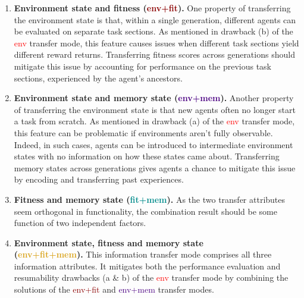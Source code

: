 \documentclass[dvipsnames,format=sigconf,anonymous=false,review=false]{acmart}
\begin{document}
\begin{enumerate}
\item \textbf{Environment state and fitness (\textcolor{DarkRed}{env+fit}).} One property of transferring the environment state is that, within a single generation, different agents can be evaluated on separate task sections. As mentioned in drawback (b) of the \textcolor{red}{env} transfer mode, this feature causes issues when different task sections yield different reward returns. Transferring fitness scores across generations should mitigate this issue by accounting for performance on the previous task sections, experienced by the agent’s ancestors.
 
\item \textbf{Environment state and memory state (\textcolor{Indigo}{env+mem}).} Another property of transferring the environment state is that new agents often no longer start a task from scratch. As mentioned in drawback (a) of the \textcolor{red}{env} transfer mode, this feature can be problematic if environments aren't fully observable. Indeed, in such cases, agents can be introduced to intermediate environment states with no information on how these states came about. Transferring memory states across generations gives agents a chance to mitigate this issue by encoding and transferring past experiences.

\item \textbf{Fitness and memory state (\textcolor{DarkCyan}{fit+mem}).} As the two transfer attributes seem orthogonal in functionality, the combination result should be some function of two independent factors.

\item \textbf{Environment state, fitness and memory state\\(\textcolor{Goldenrod}{env+fit+mem}).} This information transfer mode comprises all three information attributes. It mitigates both the performance evaluation and resumability drawbacks (a \& b) of the \textcolor{red}{env} transfer mode by combining the solutions of the \textcolor{DarkRed}{env+fit} and \textcolor{Indigo}{env+mem} transfer modes.
\end{enumerate}
\end{document}
